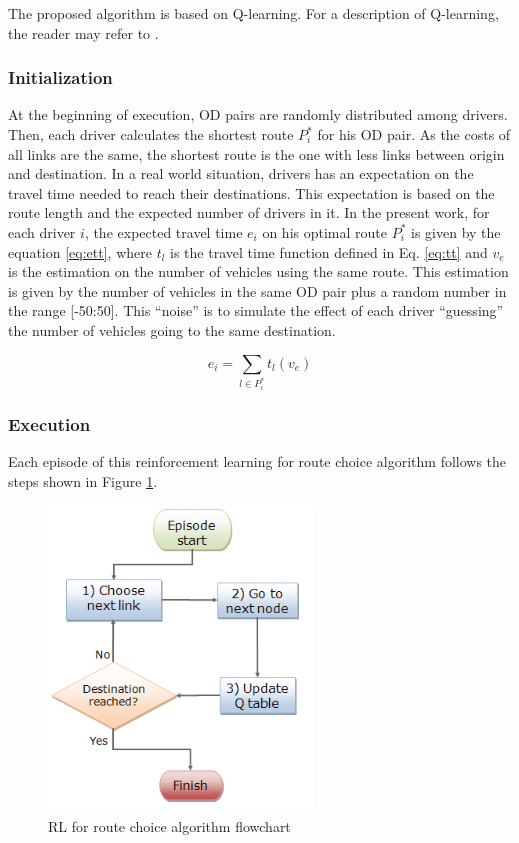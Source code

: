\documentclass[12pt]{article}
\newcommand{\optRoute}[1]{\ensuremath{P_#1^*}}	%
\newcommand{\travTime}{\ensuremath{t_l}} 	%
\newcommand{\ett}[1]{\ensuremath{e_#1}}		%
\newcommand{\expVeh}{\ensuremath{v_e}}		%
\begin{document}
The proposed algorithm is based on Q-learning. For a description of Q-learning, the reader may refer to \cite{Watkins&Dayan1992}. 

\subsubsection{Initialization}
At the beginning of execution, OD pairs are randomly distributed among drivers. Then, each driver calculates the shortest route $P_i^*$ for his OD pair. As the costs of all links are the same, the shortest route is the one with less links between origin and destination. In a real world situation, drivers has an expectation on the travel time needed to reach their destinations. 
This expectation is based on the route length and the expected number of drivers in it. In the present work, for each driver $i$, the expected travel time $\ett{i}$ on his optimal route \optRoute{i} is given by the equation \eqref{eq:ett}, where $\travTime$ is the travel time function defined in Eq. \eqref{eq:tt} and $\expVeh$ is the estimation on the number of vehicles using the same route. This estimation is given by the number of vehicles in the same OD pair plus a random number in the range [-50:50]. This ``noise'' is to simulate the effect of each driver ``guessing'' the number of vehicles going to the same destination. 

\begin{equation}
\label{eq:ett}
\ett{i} = \sum_{l \in \optRoute{i}}\travTime(\expVeh)
\end{equation}

\subsubsection{Execution}

Each episode of this reinforcement learning for route choice algorithm follows the steps shown in Figure \ref{fig:flowchart}.

\begin{figure}[ht]
    \centerline{\includegraphics[width=7cm]{img/flowchart2.png}}
    \caption{RL for route choice algorithm flowchart}
    \label{fig:flowchart}
\end{figure}
\end{document}
